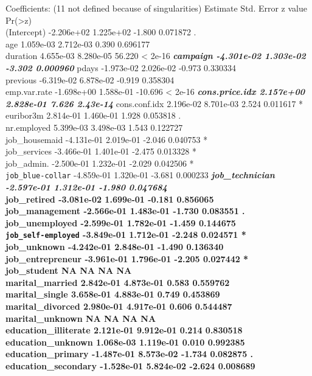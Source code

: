 \documentclass[english,man]{apa6}
\begin{document}
Coefficients: (11 not defined because of singularities) Estimate Std.
Error z value Pr(\textgreater{}\textbar{}z\textbar{})\\
(Intercept) -2.206e+02 1.225e+02 -1.800 0.071872 .\\
age 1.059e-03 2.712e-03 0.390 0.696177\\
duration 4.655e-03 8.280e-05 56.220 \textless{} 2e-16 \textbf{\emph{
campaign -4.301e-02 1.303e-02 -3.302 0.000960 }} pdays -1.973e-02
2.026e-02 -0.973 0.330334\\
previous -6.319e-02 6.878e-02 -0.919 0.358304\\
emp.var.rate -1.698e+00 1.588e-01 -10.696 \textless{} 2e-16
\textbf{\emph{ cons.price.idx 2.157e+00 2.828e-01 7.626 2.43e-14 }}
cons.conf.idx 2.196e-02 8.701e-03 2.524 0.011617 *\\
euribor3m 2.814e-01 1.460e-01 1.928 0.053818 .\\
nr.employed 5.399e-03 3.498e-03 1.543 0.122727\\
job\_housemaid -4.131e-01 2.019e-01 -2.046 0.040753 *\\
job\_services -3.466e-01 1.401e-01 -2.475 0.013328 *\\
job\_admin. -2.500e-01 1.232e-01 -2.029 0.042506 *\\
\texttt{job\_blue-collar} -4.859e-01 1.320e-01 -3.681 0.000233
\textbf{\emph{ job\_technician -2.597e-01 1.312e-01 -1.980 0.047684 }\\
job\_retired -3.081e-02 1.699e-01 -0.181 0.856065\\
job\_management -2.566e-01 1.483e-01 -1.730 0.083551 .\\
job\_unemployed -2.599e-01 1.782e-01 -1.459 0.144675\\
\texttt{job\_self-employed} -3.849e-01 1.712e-01 -2.248 0.024571 *\\
job\_unknown -4.242e-01 2.848e-01 -1.490 0.136340\\
job\_entrepreneur -3.961e-01 1.796e-01 -2.205 0.027442 *\\
job\_student NA NA NA NA\\
marital\_married 2.842e-01 4.873e-01 0.583 0.559762\\
marital\_single 3.658e-01 4.883e-01 0.749 0.453869\\
marital\_divorced 2.980e-01 4.917e-01 0.606 0.544487\\
marital\_unknown NA NA NA NA\\
education\_illiterate 2.121e-01 9.912e-01 0.214 0.830518\\
education\_unknown 1.068e-03 1.119e-01 0.010 0.992385\\
education\_primary -1.487e-01 8.573e-02 -1.734 0.082875 .\\
education\_secondary -1.528e-01 5.824e-02 -2.624 0.008689 }
\end{document}
